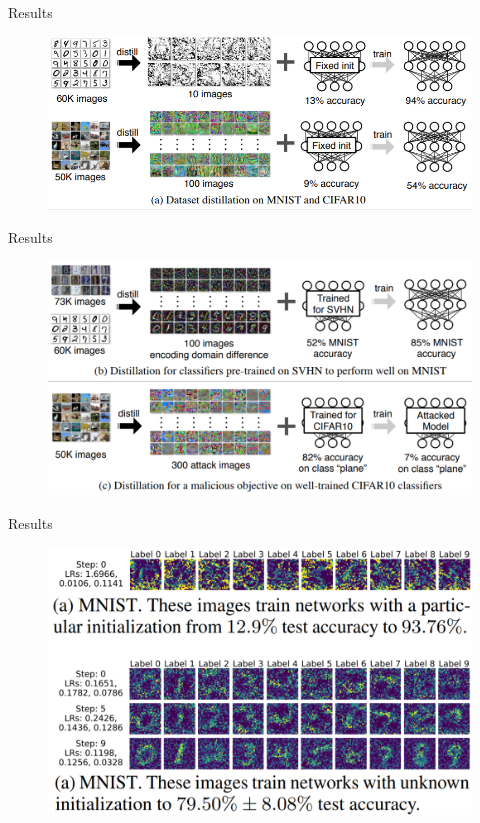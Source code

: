 \documentclass{beamer}
\begin{document}
\begin{frame}{Results}
\begin{figure}[h]
\includegraphics[width=\textwidth]{img/uses1}
\end{figure}
\end{frame}
\begin{frame}{Results}
\begin{figure}[h]
\includegraphics[width=\textwidth]{img/uses2}
\end{figure}
\end{frame}
\begin{frame}{Results}
\begin{figure}[h]
\includegraphics[width=\textwidth]{img/results1}
\end{figure}
\end{frame}
\end{document}
